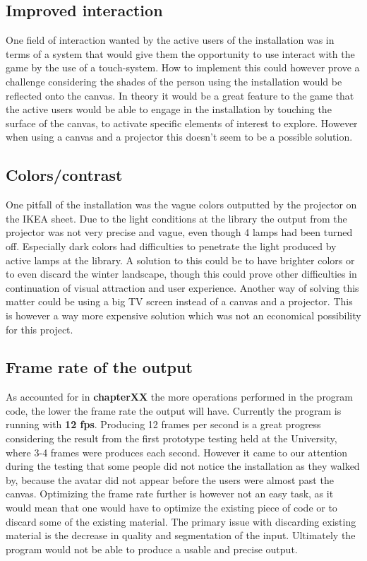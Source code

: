\subsection{Improved interaction}
One field of interaction wanted by the active users of the installation was in terms of a system that would give them the opportunity to use interact with the game by the use of a touch-system. How to implement this could however prove a challenge considering the shades of the person using the installation would be reflected onto the canvas. In theory it would be a great feature to the game that the active users would be able to engage in the installation by touching the surface of the canvas, to activate specific elements of interest to explore. However when using a canvas and a projector this doesn't seem to be a possible solution.
\subsection{Colors/contrast}
One pitfall of the installation was the vague colors outputted by the projector on the IKEA sheet. Due to the light conditions at the library the output from the projector was not very precise and vague, even though 4 lamps had been turned off. Especially dark colors had difficulties to penetrate the light produced by active lamps at the library. A solution to this could be to have brighter colors or to even discard the winter landscape, though this could prove other difficulties in continuation of visual attraction and user experience. Another way of solving this matter could be using a big TV screen instead of a canvas and a projector. This is however a way more expensive solution which was not an economical possibility for this project.
 \subsection{Frame rate of the output}
As accounted for in \textbf{chapterXX} the more operations performed in the program code, the lower the frame rate the output will have. Currently the program is running with \textbf{12 fps}. Producing 12 frames per second is a great progress considering the result from the first prototype testing held at the University, where 3-4 frames were produces each second. However it came to our attention during the testing that some people did not notice the installation as they walked by, because the avatar did not appear before the users were almost past the canvas. Optimizing the frame rate further is however not an easy task, as it would mean that one would have to optimize the existing piece of code or to discard some of the existing material. The primary issue with discarding existing material is the decrease in quality and segmentation of the input. Ultimately the program would not be able to produce a usable and precise output.   

